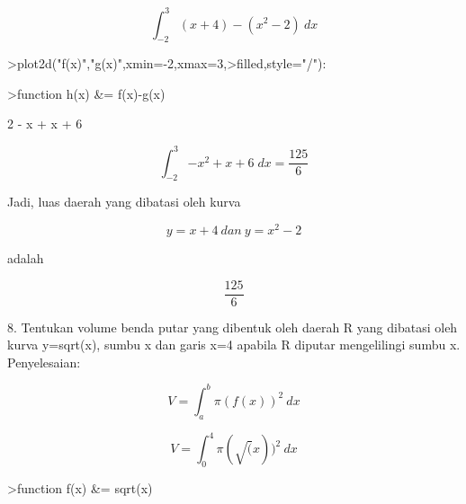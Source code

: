 \documentclass{article}
\begin{document}
\begin{eulernotebook}
\begin{eulercomment}
\begin{eulercomment}
\begin{eulerformula}
\[
\int_{-2}^{3} (x+4)-(x^2-2)\ dx
\]
\end{eulerformula}
\begin{eulerprompt}
>plot2d("f(x)","g(x)",xmin=-2,xmax=3,>filled,style="/"):
\end{eulerprompt}
\begin{eulerprompt}
>function h(x) &= f(x)-g(x)
\end{eulerprompt}
\begin{euleroutput}
  
                                  2
                               - x  + x + 6
  
\end{euleroutput}
\begin{eulerformula}
\[
\int_{-2}^{3}{-x^2+x+6\;dx}=\frac{125}{6}
\]
\end{eulerformula}
\begin{eulercomment}
Jadi, luas daerah yang dibatasi oleh kurva\\
\end{eulercomment}
\begin{eulerformula}
\[
y=x+4\ dan\ y=x^2-2
\]
\end{eulerformula}
\begin{eulercomment}
adalah\\
\end{eulercomment}
\begin{eulerformula}
\[
\frac{125}{6}
\]
\end{eulerformula}
\begin{eulercomment}
8. Tentukan volume benda putar yang dibentuk oleh daerah R yang
dibatasi oleh kurva y=sqrt(x), sumbu x dan garis x=4 apabila R diputar
mengelilingi sumbu x.\\
Penyelesaian:\\
\end{eulercomment}
\begin{eulerformula}
\[
V=\int_{a}^{b} \pi(f(x))^2\ dx
\]
\end{eulerformula}
\begin{eulerformula}
\[
V=\int_{0}^{4} \pi(\sqrt(x))^2\ dx
\]
\end{eulerformula}
\begin{eulerprompt}
>function f(x) &= sqrt(x)
\end{eulerprompt}
\begin{euleroutput}
  

\end{euleroutput}
\end{eulercomment}
\end{eulercomment}
\end{eulernotebook}
\end{document}
